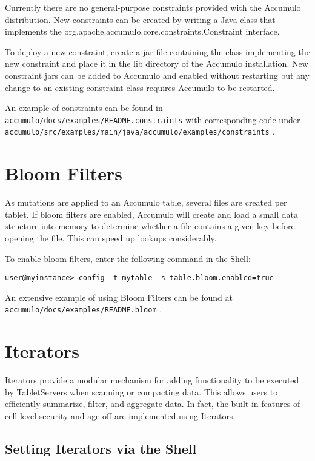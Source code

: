 Currently there are no general-purpose constraints provided with the Accumulo
distribution. New constraints can be created by writing a Java class that implements
the org.apache.accumulo.core.constraints.Constraint interface.

To deploy a new constraint, create a jar file containing the class implementing the
new constraint and place it in the lib directory of the Accumulo installation. New
constraint jars can be added to Accumulo and enabled without restarting but any
change to an existing constraint class requires Accumulo to be restarted.

An example of constraints can be found in\\
\texttt{accumulo/docs/examples/README.constraints} with corresponding code under\\
\texttt{accumulo/src/examples/main/java/accumulo/examples/constraints} .

\section{Bloom Filters}
As mutations are applied to an Accumulo table, several files are created per tablet. If
bloom filters are enabled, Accumulo will create and load a small data structure into
memory to determine whether a file contains a given key before opening the file.
This can speed up lookups considerably.

To enable bloom filters, enter the following command in the Shell:

\small
\begin{verbatim}
user@myinstance> config -t mytable -s table.bloom.enabled=true
\end{verbatim}
\normalsize

An extensive example of using Bloom Filters can be found at\\
\texttt{accumulo/docs/examples/README.bloom} .

\section{Iterators}
Iterators provide a modular mechanism for adding functionality to be executed by
TabletServers when scanning or compacting data. This allows users to efficiently
summarize, filter, and aggregate data. In fact, the built-in features of cell-level
security and age-off are implemented using Iterators.

\subsection{Setting Iterators via the Shell}

